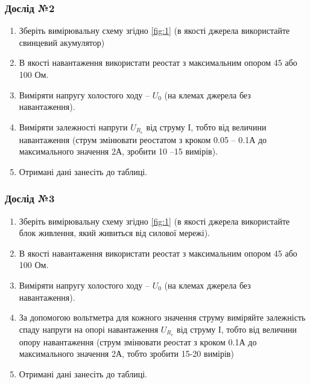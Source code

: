 \documentclass[a4paper,12pt]{article}
\begin{document}
\begin{justify}
	\subsubsection{Дослід №2}
	\begin{enumerate}
		\item Зберіть вимірювальну схему згідно \ref{fig:1} (в якості джерела використайте свинцевий акумулятор) 
		\item В якості навантаження використати реостат з максимальним опором 45 або 100 Ом.
		\item Виміряти напругу холостого ходу – $U_0$ (на клемах джерела без навантаження).
		\item Виміряти залежності напруги $U_{R_e}$ від струму $І$, тобто від величини навантаження (струм змінювати реостатом з кроком 0.05 – 0.1А до максимального значення 2А, зробити 10 –15 вимірів).
		\item Отримані дані занесіть до таблиці.
	\end{enumerate}
	\subsubsection{Дослід №3}
	\begin{enumerate}
		\item Зберіть вимірювальну схему згідно \ref{fig:1} (в якості джерела використайте блок живлення, який живиться від силової мережі).
		\item В якості навантаження використати реостат з максимальним опором 45 або 100 Ом.
		\item Виміряти напругу холостого ходу – $U_0$ (на клемах джерела без навантаження).
		\item За допомогою вольтметра для кожного значення струму виміряйте залежність спаду напруги на опорі навантаження $U_{R_e}$ від струму $І$, тобто від величини опору навантаження (струм змінювати реостат з кроком 0.1А до максимального значення 2А, тобто зробити 15-20 вимірів)
		\item Отримані дані занесіть до таблиці.
	\end{enumerate}

\end{justify}
\end{document}

